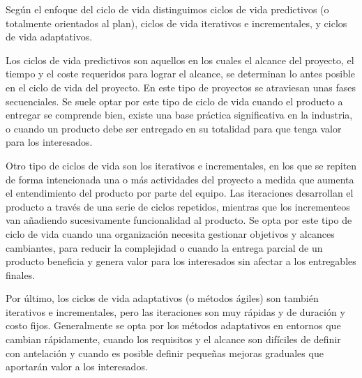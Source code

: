 Según el enfoque del ciclo de vida distinguimos ciclos de vida predictivos (o totalmente orientados al plan), ciclos de vida iterativos e incrementales, y ciclos de vida adaptativos.

Los ciclos de vida predictivos son aquellos en los cuales el alcance del proyecto, el tiempo y el coste requeridos para lograr el alcance, se determinan lo antes posible en el ciclo de vida del proyecto. En este tipo de proyectos se atraviesan unas fases secuenciales. Se suele optar por este tipo de ciclo de vida cuando el producto a entregar se comprende bien, existe una base práctica significativa en la industria, o cuando un producto debe ser entregado en su totalidad para que tenga valor para los interesados.

Otro tipo de ciclos de vida son los iterativos e incrementales, en los que se repiten de forma intencionada una o más actividades del proyecto a medida que aumenta el entendimiento del producto por parte del equipo. Las iteraciones desarrollan el producto a través de una serie de ciclos repetidos, mientras que los incrementeos van añadiendo sucesivamente funcionalidad al producto. Se opta por este tipo de ciclo de vida cuando una organización necesita gestionar objetivos y alcances cambiantes, para reducir la complejidad o cuando la entrega parcial de un producto beneficia y genera valor para los interesados sin afectar a los entregables finales.

Por último, los ciclos de vida adaptativos (o métodos ágiles) son también iterativos e incrementales, pero las iteraciones son muy rápidas y de duración y costo fijos. Generalmente se opta por los métodos adaptativos en entornos que cambian rápidamente, cuando los requisitos y el alcance son difíciles de definir con antelación y cuando es posible definir pequeñas mejoras graduales que aportarán valor a los interesados.
